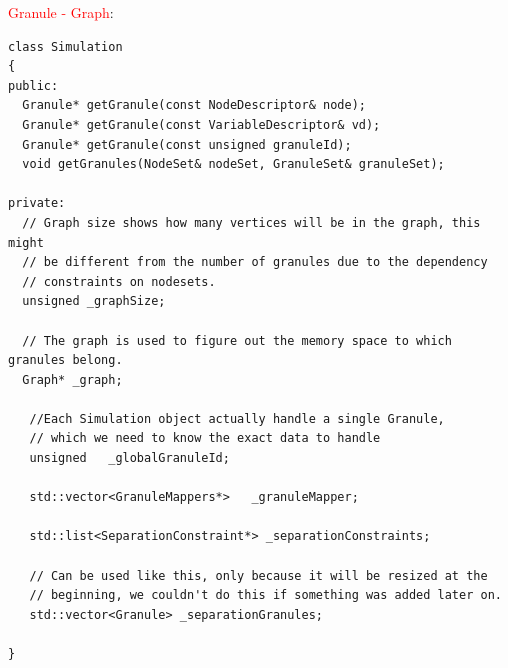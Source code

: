 \textcolor{red}{Granule - Graph}:
\begin{lstlisting}
class Simulation
{
public:
  Granule* getGranule(const NodeDescriptor& node);
  Granule* getGranule(const VariableDescriptor& vd);
  Granule* getGranule(const unsigned granuleId);
  void getGranules(NodeSet& nodeSet, GranuleSet& granuleSet);

private:
  // Graph size shows how many vertices will be in the graph, this might
  // be different from the number of granules due to the dependency
  // constraints on nodesets.
  unsigned _graphSize;

  // The graph is used to figure out the memory space to which granules belong.
  Graph* _graph;

   //Each Simulation object actually handle a single Granule,
   // which we need to know the exact data to handle
   unsigned   _globalGranuleId;

   std::vector<GranuleMappers*>   _granuleMapper;
   
   std::list<SeparationConstraint*> _separationConstraints;
   
   // Can be used like this, only because it will be resized at the
   // beginning, we couldn't do this if something was added later on.
   std::vector<Granule> _separationGranules;

}
\end{lstlisting}


